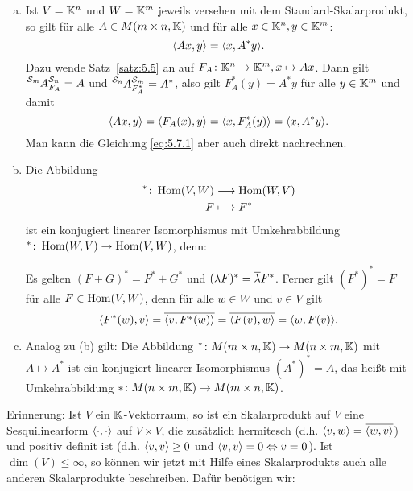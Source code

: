 \begin{bemerkung}
	\label{bem:5.7}
	\begin{enumerate}[(a)]
		\item Ist $V = \mathbb{K}^n$ und $W = \mathbb{K}^m$ jeweils versehen mit dem Standard-Skalarprodukt, so gilt für alle $A \in M(m \times n,\mathbb{K})$ und für alle $x \in \mathbb{K}^n, y \in \mathbb{K}^m$:
		\begin{equation}
			\sk{Ax,y} = \sk{x,A^*y}. \label{eq:5.7.1}
		\end{equation}
		Dazu wende Satz~\ref{satz:5.5} an auf $F_A \colon \mathbb{K}^n \rightarrow \mathbb{K}^m, x \mapsto Ax$.
		Dann gilt $\mat{A}{\mathcal{S}_m}{\mathcal{S}_n}{F_A} =A$ und $\mat{A}{\mathcal{S}_n}{\mathcal{S}_m}{F_A^*} = A^*$, also gilt $F_A^*(y) = A^*y$ für alle $y \in \mathbb{K}^m$ und damit
		\[
			\sk{Ax,y} = \sk{F_A(x),y} = \sk{x,F_A^*(y)} = \sk{x,A^*y}.
		\]
		Man kann die Gleichung \eqref{eq:5.7.1} aber auch direkt nachrechnen.
		\item Die Abbildung
		\begin{align*}
			^*\colon \operatorname{Hom}(V,W) &\longrightarrow \operatorname{Hom}(W,V) \\
			F &\longmapsto F^*
		\end{align*}
		ist ein konjugiert linearer Isomorphismus mit Umkehrabbildung $^*\colon \operatorname{Hom}(W,V) \rightarrow \operatorname{Hom}(V,W)$, denn:
		
		Es gelten $(F+G)^* = F^* + G^*$ und $(\lambda F)^* = \overline{\lambda} F^*$.
		Ferner gilt $(F^*)^* = F$ für alle $F \in \operatorname{Hom}(V,W)$, denn für alle $w \in W$ und $v \in V$ gilt
		\[
			\sk{F^*(w),v} = \ol{\sk{v,F^*(w)}} = \ol{\sk{F(v),w}} = \sk{w,F(v)}.
		\]
		\item Analog zu (b) gilt:
		Die Abbildung $^*\colon M(m \times n, \mathbb{K}) \rightarrow M(n \times m, \mathbb{K})$ mit $A \mapsto A^*$ ist ein konjugiert linearer Isomorphismus $(A^*)^* = A$, das heißt mit Umkehrabbildung $*\colon M(n \times m, \mathbb{K}) \rightarrow M(m \times n, \mathbb{K})$.
	\end{enumerate}
\end{bemerkung}

Erinnerung: Ist $V$ ein $\mathbb{K}$-Vektorraum, so ist ein Skalarprodukt auf $V$ eine Sesquilinearform $\left\langle\cdot,\cdot\right\rangle$ auf $V \times V$, die zusätzlich hermitesch (d.h. $\left\langle v,w\right\rangle = \overline{\left\langle w,v\right\rangle}$) und positiv definit ist (d.h. $\left\langle v,v\right\rangle \geq 0$ und $\left\langle v,v\right\rangle = 0 \Leftrightarrow v = 0$).
Ist $\dim(V) \leq \infty$, so können wir jetzt mit Hilfe eines Skalarprodukts auch alle anderen Skalarprodukte beschreiben.
Dafür benötigen wir:


